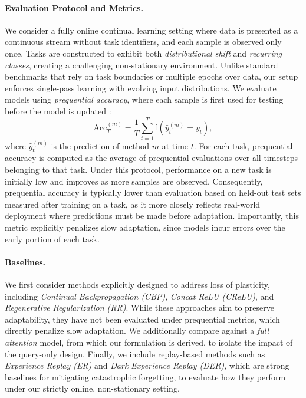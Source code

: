 \documentclass{article}
\begin{document}
\paragraph{Evaluation Protocol and Metrics.}
We consider a fully online continual learning setting where data is presented as a continuous stream without task identifiers, and each sample is observed only once. Tasks are constructed to exhibit both \emph{distributional shift} and \emph{recurring classes}, creating a challenging non-stationary environment. Unlike standard benchmarks that rely on task boundaries or multiple epochs over data, our setup enforces single-pass learning with evolving input distributions.
We evaluate models using \emph{prequential accuracy}, where each sample is first used for testing before the model is updated \citep{dawid1984present}:
\[
\mathrm{Acc}_T^{(m)} = \frac{1}{T}\sum_{t=1}^{T}\mathbb{I}(\hat{y}_t^{(m)} = y_t),
\]
where $\hat{y}_t^{(m)}$ is the prediction of method $m$ at time $t$.
For each task, prequential accuracy is computed as the average of prequential evaluations over all timesteps belonging to that task.
Under this protocol, performance on a new task is initially low and improves as more samples are observed. Consequently, prequential accuracy is typically lower than evaluation based on held-out test sets measured after training on a task, as it more closely reflects real-world deployment where predictions must be made before adaptation. Importantly, this metric explicitly penalizes slow adaptation, since models incur errors over the early portion of each task.


\paragraph{Baselines.}
We first consider methods explicitly designed to address loss of plasticity, including \emph{Continual Backpropagation (CBP)}, \emph{Concat ReLU (CReLU)}, and \emph{Regenerative Regularization (RR)}. While these approaches aim to preserve adaptability, they have not been evaluated under prequential metrics, which directly penalize slow adaptation.
We additionally compare against a \emph{full attention} model, from which our formulation is derived, to isolate the impact of the query-only design.
Finally, we include replay-based methods such as \emph{Experience Replay (ER)} and \emph{Dark Experience Replay (DER)}, which are strong baselines for mitigating catastrophic forgetting, to evaluate how they perform under our strictly online, non-stationary setting.
\end{document}
